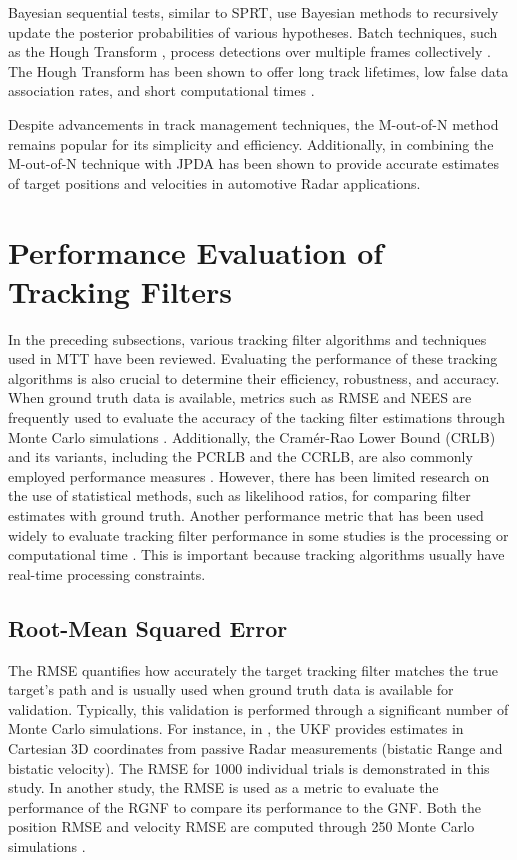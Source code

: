 Bayesian sequential tests, similar to \ac{SPRT}, use Bayesian methods to recursively update the posterior probabilities of various hypotheses. Batch techniques, such as the Hough Transform \cite{Leung1996}, process detections over multiple frames collectively \cite{Blanding2009}. The Hough Transform has been shown to offer long track lifetimes, low false data association rates, and short computational times \cite{Leung1996}.

Despite advancements in track management techniques, the M-out-of-N method remains popular for its simplicity and efficiency. Additionally, in \cite{Khalil2016a} combining the M-out-of-N technique with \ac{JPDA} has been shown to provide accurate estimates of target positions and velocities in automotive \ac{Radar} applications.

\section{Performance Evaluation of Tracking Filters }
In the preceding subsections, various tracking filter algorithms and techniques used in \ac{MTT} have been reviewed. Evaluating the performance of these tracking algorithms is also crucial to determine their efficiency, robustness, and accuracy. When ground truth data is available, metrics such as \ac{RMSE} and \ac{NEES} are frequently used to evaluate the accuracy of the tacking filter estimations through Monte Carlo simulations \cite{Ding, Omar2012a, Inggs1, Nadjiasngar2011a}. Additionally, the Cramér-Rao Lower Bound (CRLB) and its variants, including the \ac{PCRLB} and the \ac{CCRLB}, are also commonly employed performance measures \cite{Junler2020, Nadjiasngar2012, Bauermeister2016}. However, there has been limited research on the use of statistical methods, such as likelihood ratios, for comparing filter estimates with ground truth. Another performance metric that has been used widely to evaluate tracking filter performance in some studies is the processing or computational time \cite{Salih2011,Konstantinova2003}. This is important because tracking algorithms usually have real-time processing constraints.

\subsection{Root-Mean Squared Error}
The \ac{RMSE} quantifies how accurately the target tracking filter matches the true target's path and is usually used when ground truth data is available for validation. Typically, this validation is performed through a significant number of Monte Carlo simulations. For instance, in \cite{Konovalov2016}, the \ac{UKF} provides estimates in Cartesian 3D coordinates from passive \ac{Radar} measurements (bistatic Range and bistatic velocity). The \ac{RMSE} for 1000 individual trials is demonstrated in this study. In another study, the \ac{RMSE} is used as a metric to evaluate the performance of the \ac{RGNF} to compare its performance to the \ac{GNF}. Both the position \ac{RMSE} and velocity \ac{RMSE} are computed through 250 Monte Carlo simulations \cite{Inggs1}.

